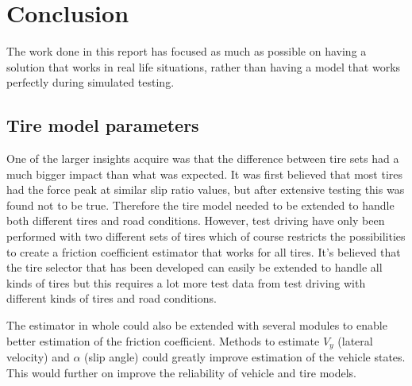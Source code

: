 \chapter{Conclusion}

The work done in this report has focused as much as possible on having a solution that works in real life situations, rather than having a model that works perfectly during simulated testing. 

\section{Tire model parameters}
One of the larger insights acquire was that the difference between tire sets had a much bigger impact than what was expected. It was first believed that most tires had the force peak at similar slip ratio values, but after extensive testing this was found not to be true. Therefore the tire model needed to be extended to handle both different tires and road conditions. However, test driving have only been performed with two different sets of tires which of course restricts the possibilities to create a friction coefficient estimator that works for all tires. It's believed that the tire selector that has been developed can easily be extended to handle all kinds of tires but this requires a lot more test data from test driving with different kinds of tires and road conditions.

The estimator in whole could also be extended with several modules to enable better estimation of the friction coefficient. Methods to estimate $ V_{y} $ (lateral velocity) and $ \alpha $ (slip angle) could greatly improve estimation of the vehicle states. This would further on improve the reliability of vehicle and tire models.

